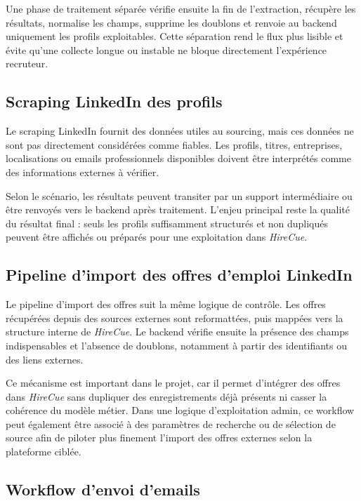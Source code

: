 Une phase de traitement séparée vérifie ensuite la fin de l'extraction, récupère les résultats, normalise les champs, supprime les doublons et renvoie au backend uniquement les profils exploitables. Cette séparation rend le flux plus lisible et évite qu'une collecte longue ou instable ne bloque directement l'expérience recruteur.

\subsection{Scraping LinkedIn des profils}

Le scraping LinkedIn fournit des données utiles au sourcing, mais ces données ne sont pas directement considérées comme fiables. Les profils, titres, entreprises, localisations ou emails professionnels disponibles doivent être interprétés comme des informations externes à vérifier.

Selon le scénario, les résultats peuvent transiter par un support intermédiaire ou être renvoyés vers le backend après traitement. L'enjeu principal reste la qualité du résultat final : seuls les profils suffisamment structurés et non dupliqués peuvent être affichés ou préparés pour une exploitation dans \textit{HireCue}.

\subsection{Pipeline d'import des offres d'emploi LinkedIn}

Le pipeline d'import des offres suit la même logique de contrôle. Les offres récupérées depuis des sources externes sont reformattées, puis mappées vers la structure interne de \textit{HireCue}. Le backend vérifie ensuite la présence des champs indispensables et l'absence de doublons, notamment à partir des identifiants ou des liens externes.

Ce mécanisme est important dans le projet, car il permet d'intégrer des offres dans \textit{HireCue} sans dupliquer des enregistrements déjà présents ni casser la cohérence du modèle métier. Dans une logique d'exploitation admin, ce workflow peut également être associé à des paramètres de recherche ou de sélection de source afin de piloter plus finement l'import des offres externes selon la plateforme ciblée.

\subsection{Workflow d'envoi d'emails}


